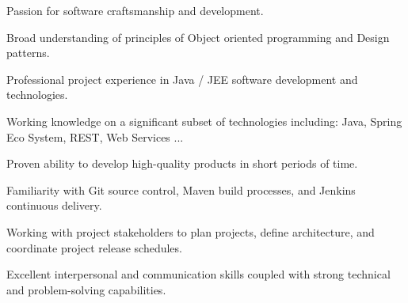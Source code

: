 \begin{cventries}
  \cventryskill
    {
      \begin{cvskillitems}
        \item {Passion for software craftsmanship and development.}
        \item {Broad understanding of principles of Object oriented programming and Design patterns.}
        \item {Professional project experience in Java / JEE software development and technologies.}
        \item {Working knowledge on a significant subset of technologies including: Java, Spring Eco System, REST, Web Services ...}
        \item {Proven ability to develop high-quality products in short periods of time.}
        \item {Familiarity with Git source control, Maven build processes, and Jenkins continuous delivery.}
        \item {Working with project stakeholders to plan projects, define architecture, and coordinate project release schedules.}
        \item {Excellent interpersonal and communication skills coupled with strong technical and problem-solving capabilities.}
      \end{cvskillitems}
    }
\end{cventries}